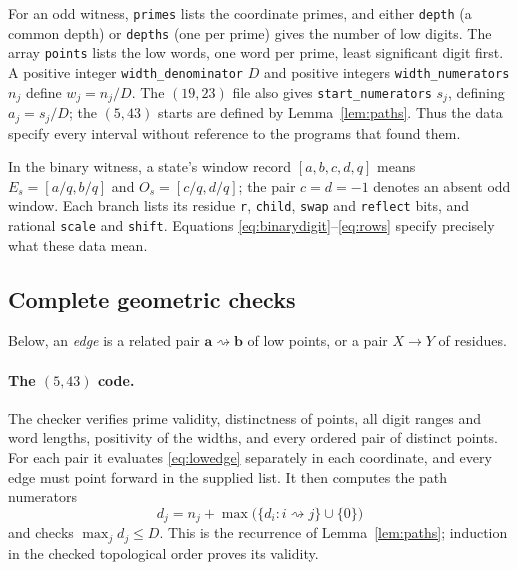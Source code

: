 \documentclass[11pt]{article}
\theoremstyle{definition}
\theoremstyle{remark}
\newcommand{\sto}{\rightsquigarrow}
\begin{document}
For an odd witness, \texttt{primes} lists the coordinate primes, and either
\texttt{depth} (a common depth) or \texttt{depths} (one per prime) gives the
number of low digits. The array \texttt{points} lists the low words, one word
per prime, least significant digit first. A positive integer
\texttt{width\_denominator} $D$ and positive integers
\texttt{width\_numerators} $n_j$ define $w_j=n_j/D$. The $(19,23)$ file also
gives \texttt{start\_numerators} $s_j$, defining $a_j=s_j/D$; the $(5,43)$
starts are defined by Lemma~\ref{lem:paths}. Thus the data specify every
interval without reference to the programs that found them.

In the binary witness, a state's window record $[a,b,c,d,q]$ means
$E_s=[a/q,b/q]$ and $O_s=[c/q,d/q]$; the pair $c=d=-1$ denotes an absent odd
window. Each branch lists its residue \texttt{r}, \texttt{child},
\texttt{swap} and \texttt{reflect} bits, and rational \texttt{scale} and
\texttt{shift}. Equations \eqref{eq:binarydigit}--\eqref{eq:rows} specify
precisely what these data mean.

\subsection{Complete geometric checks}
Below, an \emph{edge} is a related pair $\mathbf a\sto\mathbf b$ of low
points, or a pair $X\to Y$ of residues.

\paragraph{The $(5,43)$ code.} The checker verifies prime validity,
distinctness of points, all digit ranges and word lengths, positivity of the
widths, and every ordered pair of distinct points. For each pair it evaluates
\eqref{eq:lowedge} separately in each coordinate, and every edge must point
forward in the supplied list. It then computes the path numerators
\[
 d_j=n_j+\max\bigl(\{d_i:i\sto j\}\cup\{0\}\bigr)
\]
and checks $\max_jd_j\le D$. This is the recurrence of
Lemma~\ref{lem:paths}; induction in the checked topological order proves its
validity.
\end{document}
